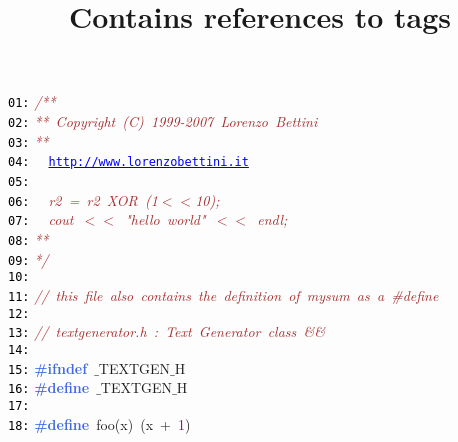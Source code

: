\documentclass{article}
\title{Contains references to tags}
\date{}
\begin{document}
\maketitle
\noindent
\mbox{}\texttt{\textcolor{Black}{01:}} \textit{\textcolor{Brown}{/**}} \\
\mbox{}\texttt{\textcolor{Black}{02:}} \textit{\textcolor{Brown}{**\ Copyright\ (C)\ 1999-2007\ Lorenzo\ Bettini}} \\
\mbox{}\texttt{\textcolor{Black}{03:}} \textit{\textcolor{Brown}{**\ \ }} \\
\mbox{}\texttt{\textcolor{Black}{04:}} \textit{\textcolor{Brown}{\ \ }}\underline{\texttt{\textcolor{Blue}{http://www.lorenzobettini.it}}} \\
\mbox{}\texttt{\textcolor{Black}{05:}} \textit{\textcolor{Brown}{\ \ }} \\
\mbox{}\texttt{\textcolor{Black}{06:}} \textit{\textcolor{Brown}{\ \ r2\ =\ r2\ XOR\ (1$<$$<$10);}} \\
\mbox{}\texttt{\textcolor{Black}{07:}} \textit{\textcolor{Brown}{\ \ cout\ $<$$<$\ "{}hello\ world"{}\ $<$$<$\ endl;}} \\
\mbox{}\texttt{\textcolor{Black}{08:}} \textit{\textcolor{Brown}{**\ \ }} \\
\mbox{}\texttt{\textcolor{Black}{09:}} \textit{\textcolor{Brown}{*/}} \\
\mbox{}\texttt{\textcolor{Black}{10:}}  \\
\mbox{}\texttt{\textcolor{Black}{11:}} \textit{\textcolor{Brown}{//\ this\ file\ also\ contains\ the\ definition\ of\ mysum\ as\ a\ \#define}} \\
\mbox{}\texttt{\textcolor{Black}{12:}}  \\
\mbox{}\texttt{\textcolor{Black}{13:}} \textit{\textcolor{Brown}{//\ textgenerator.h\ :\ Text\ Generator\ class\ \&\&}} \\
\mbox{}\texttt{\textcolor{Black}{14:}}  \\
\mbox{}\texttt{\textcolor{Black}{15:}} \textbf{\textcolor{RoyalBlue}{\#ifndef}}\ $\_$TEXTGEN$\_$H \\
\mbox{}\texttt{\textcolor{Black}{16:}} \textbf{\textcolor{RoyalBlue}{\#define}}\ \label{test.h:16}$\_$TEXTGEN$\_$H \\
\mbox{}\texttt{\textcolor{Black}{17:}}  \\
\mbox{}\texttt{\textcolor{Black}{18:}} \textbf{\textcolor{RoyalBlue}{\#define}}\ \label{test.h:18}foo\textcolor{BrickRed}{(}x\textcolor{BrickRed}{)}\ \textcolor{BrickRed}{(}x\ \textcolor{BrickRed}{+}\ \textcolor{Purple}{1}\textcolor{BrickRed}{)} \\
\end{document}
